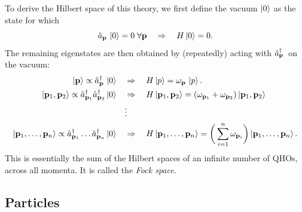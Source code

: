 To derive the Hilbert space of this theory, we first define the vacuum $\ket{0}$ as the state for which
\begin{equation}
    \label{eq:01_qft_quantization_hamiltonian_vacuum}
    \hat a_{\mathbf{p}}\, \ket{0} = 0\; \forall \mathbf{p} \quad \Rightarrow \quad H\ket{0} = 0.
\end{equation}
The remaining eigenstates are then obtained by (repeatedly) acting with $\hat a^\dagger_{\mathbf{p}}\,$ on the vacuum:
\begin{equation}
    \label{eq:01_qft_quantization_hamiltonian_states}
    \begin{split}
        \ket{\mathbf{p}} \propto \hat a^\dagger_{\mathbf{p}}\,\ket{0} \quad &\Rightarrow \quad H\ket{p} = \omega_{\mathbf{p}}\,\ket{p}. \\
        \ket{\mathbf{p}_1, \mathbf{p}_2} \propto \hat a^\dagger_{\mathbf{p}_1}\hat a^\dagger_{\mathbf{p}_2}\ket{0} \quad &\Rightarrow \quad H\ket{\mathbf{p}_1, \mathbf{p}_2} = (\omega_{\mathbf{p}_1} + \omega_{\mathbf{p}_2})\ket{\mathbf{p}_1, \mathbf{p}_2} \\
        &\vdots \\
        \ket{\mathbf{p}_1, \ldots, \mathbf{p}_n} \propto \hat a^\dagger_{\mathbf{p}_1} \ldots\hat a^\dagger_{\mathbf{p}_n}\ket{0} \quad &\Rightarrow \quad H\ket{\mathbf{p}_1, \ldots, \mathbf{p}_n} = \bigg(\sum_{i=1}^n \omega_{\mathbf{p}_i}\bigg) \ket{\mathbf{p}_1,  \ldots, \mathbf{p}_n}.
    \end{split}
\end{equation}
This is essentially the sum of the Hilbert spaces of an infinite number of QHOs, across all momenta.
It is called the \textit{Fock space}.

\subsection{Particles}

